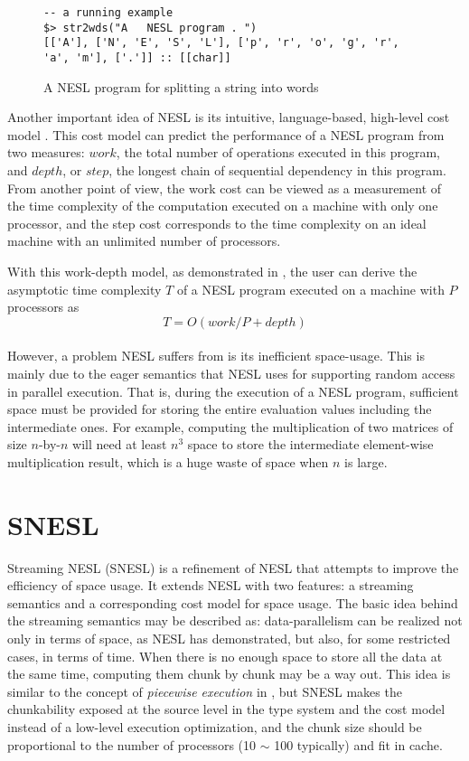\begin{figure}[H]
 
\begin{lstlisting}[style=nesl-style]
-- a running example
$> str2wds("A   NESL program . ")
[['A'], ['N', 'E', 'S', 'L'], ['p', 'r', 'o', 'g', 'r', 'a', 'm'], ['.']] :: [[char]]
\end{lstlisting}
\caption{{A NESL program for splitting a string into words \label{fig-nesl-wordpart}}}
\end{figure}


Another important idea of NESL is its intuitive, language-based, high-level cost model \cite{blel96cost}.
This cost model can predict the performance of a NESL program from two measures: $work$, the total number of operations executed in this program, and $depth$, or $step$, the longest chain of sequential dependency in this program.
From another point of view, the work cost can be viewed as a measurement of the time complexity of the computation executed on a machine with only one processor,
and the step cost corresponds to the time complexity on an ideal machine with an unlimited number of processors. 

With this work-depth model, as demonstrated in \cite{Blel90vecmod},   the user can derive the asymptotic time complexity $T$ of a NESL program executed on a machine with $P$ processors as 
$$ T = O(work/P + depth) $$ \\


However, a problem NESL suffers from is its inefficient space-usage.
This is mainly due to the eager semantics that NESL uses for supporting random access in parallel execution.
That is, during the execution of a NESL program, sufficient space must be provided for storing the entire evaluation values including the intermediate ones.
For example, computing the multiplication of two matrices of size $n$-by-$n$ will need at least $n^3$ space to store the intermediate element-wise multiplication result, which is a huge waste of space when $n$ is large.

\section{SNESL}
Streaming NESL (SNESL) \cite{MadFil13} is a refinement of NESL
that attempts to improve the efficiency of space usage. 
It extends NESL with two features: a streaming semantics and a corresponding cost model for space usage. 
The basic idea behind the streaming semantics may be described as:
data-parallelism can be realized not only in terms of space, as NESL has demonstrated, but also, for some restricted cases, in terms of time. 
When there is no enough space to store all the data at the same time, computing them chunk by chunk may be a way out.
This idea is similar to the concept of \emph{piecewise execution} in \cite{palm95}, but SNESL makes the chunkability exposed at the source level in the type system and the cost model instead of a low-level execution optimization, and the chunk size should be  proportional to the number of processors (10 $\sim$ 100 typically) and fit in cache.

